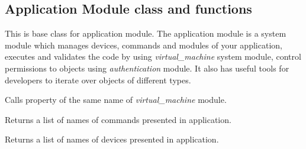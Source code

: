\documentclass[letterpaper,10pt,english]{sphinxmanual}
\begin{document}
\subsection{Application Module class and functions}
\label{sysmod:module-pyfrid.modules.system.app}\label{sysmod:application-module-class-and-functions}

\begin{fulllineitems}
\label{sysmod:pyfrid.modules.system.app.BaseApplicationModule}
This is base class for application module. The application module is a system module which
manages devices, commands and modules of your application, executes and validates the code by
using \emph{virtual\_machine} system module, control permissions to objects using \emph{authentication} module.
It also has useful tools for developers to iterate over objects of different types.

\begin{fulllineitems}
\label{sysmod:pyfrid.modules.system.app.BaseApplicationModule.busy}
Calls property of the same name of \emph{virtual\_machine} module.

\end{fulllineitems}


\begin{fulllineitems}
\label{sysmod:pyfrid.modules.system.app.BaseApplicationModule.commands}
Returns a list of names of commands presented in application.

\end{fulllineitems}


\begin{fulllineitems}
\label{sysmod:pyfrid.modules.system.app.BaseApplicationModule.devices}
Returns a list of names of devices presented in application.

\end{fulllineitems}


\end{fulllineitems}
\end{document}
